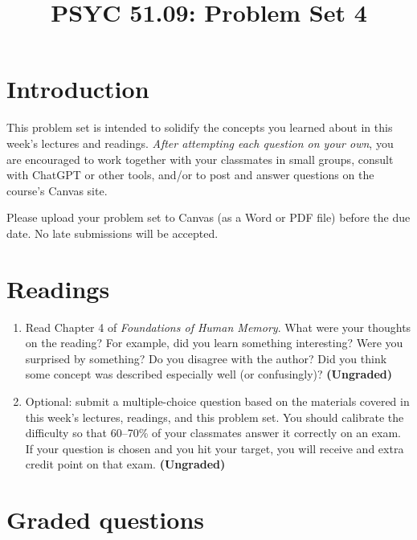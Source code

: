 \documentclass[10pt]{article}
\title{PSYC 51.09: Problem Set 4}
\date{}
\begin{document}
\maketitle
\vspace{-0.75in}
\section*{Introduction}
This problem set is intended to solidify the concepts you learned about in this
week's lectures and readings. \textit{After attempting each question on your
own}, you are encouraged to work together with your classmates in small groups,
consult with ChatGPT or other tools, and/or to post and answer questions on the
course’s Canvas site.

Please upload your problem set to Canvas (as a Word or PDF file)
before the due date.  No late submissions will be accepted.

\section*{Readings}
\begin{enumerate}
\item Read Chapter 4 of \textit{Foundations of Human Memory}.  What were your thoughts on the reading?  For example, did you learn something interesting?  Were you surprised by something?  Do you disagree with the author?  Did you think some concept was described especially well (or confusingly)?  \textbf{(Ungraded)}

\item Optional: submit a multiple-choice question based on the materials
covered in this week's lectures, readings, and this problem set. You should
calibrate the difficulty so that 60--70\% of your classmates answer it
correctly on an exam.  If your question is chosen and you hit your target,
you will receive and extra credit point on that exam.  \textbf{(Ungraded)}
\end{enumerate}

\section*{Graded questions}
\end{document}

